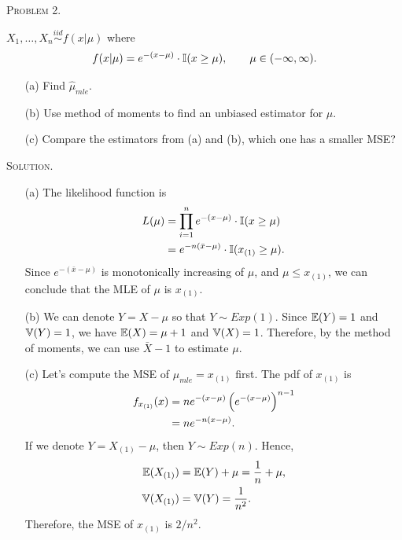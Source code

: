 \documentclass{article}
\begin{document}
\begin{CJK}{UTF8}{gbsn}
    \begin{shaded}
        \noindent\textsc{Problem 2.}\par
        $X_1, \ldots, X_n \mathop{\sim}\limits^{iid} f(x|\mu)$ where
        \begin{align}
            f(x|\mu) = e^{-(x-\mu)} \cdot {\mathbb I}(x\geq\mu), \qquad \mu \in (-\infty, \infty).
        \end{align}
        \begin{itemize}
            \item [(a)] Find $\hat{\mu}_{mle}$.
            \item [(b)] Use method of moments to find an unbiased estimator for $\mu$.
            \item [(c)] Compare the estimators from (a) and (b), which one has a smaller MSE?
        \end{itemize}
    \end{shaded}
    \noindent\textsc{Solution.}\par
    \begin{itemize}
        \item [(a)]
              The likelihood function is
              \begin{align}
                  L(\mu) & = \prod_{i=1}^n e^{-(x-\mu)} \cdot {\mathbb I}(x\geq\mu) \notag   \\
                         & = e^{-n(\bar{x} - \mu)} \cdot {\mathbb I}(x_{(1)}\geq \mu).\notag
              \end{align}
              Since $e^{-(\bar{x} - \mu)}$ is monotonically increasing of $\mu$, and $\mu \leq x_{(1)}$,
              we can conclude that the MLE of $\mu$ is $x_{(1)}$.
        \item [(b)] We can denote $Y = X-\mu$ so that $Y\sim Exp(1)$.
              Since ${\mathbb E}(Y) = 1$ and ${\mathbb V}(Y) = 1$, we have ${\mathbb E}(X) = \mu + 1$ and ${\mathbb V}(X) = 1$.
              Therefore, by the method of moments, we can use $\bar{X} - 1$ to estimate $\mu$.
        \item [(c)]
              Let's compute the MSE of $\mu_{mle}=x_{(1)}$ first.
              The pdf of $x_{(1)}$ is
              \begin{align}
                  f_{x_{(1)}}(x) & = n e^{-(x-\mu)} \left (e^{-(x-\mu)} \right )^{n-1} \notag \\
                                 & = n e^{-n(x - \mu)}.\notag
              \end{align}
              If we denote $Y=X_{(1)}-\mu$, then $Y\sim Exp(n)$. Hence,
              \begin{align}
                  {\mathbb E}(X_{(1)}) & = {\mathbb E}(Y) + \mu = \frac{1}{n} + \mu, \notag \\
                  {\mathbb V}(X_{(1)}) & = {\mathbb V}(Y) = \frac{1}{n^2}.\notag
              \end{align}
              Therefore, the MSE of $x_{(1)}$ is $2/n^2$.


\end{itemize}
\end{CJK}
\end{document}
